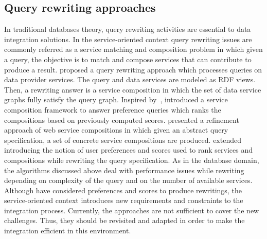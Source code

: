 \subsection{Query rewriting approaches}
In traditional databases theory, query rewriting activities are essential to 
data integration solutions. In the service-oriented context query rewriting issues
are commonly referred as a service matching and composition problem in which given a query, 
the objective is to match and compose services that can contribute to produce a result. 
\cite{Barhamgi2010} proposed a query rewriting approach which processes queries on data provider services.
The query and data services are modeled as RDF views. Then, a rewriting answer is a 
service composition in which the set of data service graphs fully satisfy the query graph.  
%
Inspired by~\cite{Barhamgi2010}, \cite{Benouaret2011} introduced a service composition 
framework to answer preference queries which ranks the compositions based on previously 
computed scores.
%
\cite{Umberto} presented a refinement approach of web service compositions in which
given an abstract query specification, a set of concrete service compositions are produced.
%
\cite{ba2014} extended \cite{Umberto} introducing the notion of user preferences and scores 
used to rank services and compositions while rewriting the query specification.
%
As in the database domain, the algorithms discussed above deal with performance issues
while rewriting depending on complexity of the query and on the number of available services.
Although \cite{Benouaret2011,ba2014} have considered preferences and scores to produce rewritings, the service-oriented context introduces new requirements and constraints to the integration process. Currently, the approaches are not sufficient to cover the new challenges. Thus, they should be revisited and adapted in order to make the integration efficient in this environment. 


